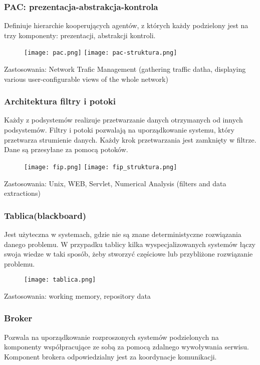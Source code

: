 \documentclass[a4paper]{article}
\begin{document}
\subsubsection{PAC: prezentacja-abstrakcja-kontrola}
Definiuje hierarchie kooperujących agentów, z których każdy
podzielony jest na trzy komponenty: prezentacji, abstrakcji kontroli.

\begin{figure}[h]
    \texttt{[image: pac.png]}
    \texttt{[image: pac-struktura.png]}
\end{figure}

    Zastosowania: Network Trafic Management (gathering traffic datha, displaying various user-configurable
    views of the whole network)

\subsubsection{Architektura filtry i potoki}

Każdy z podsystemów realizuje przetwarzanie danych
otrzymanych od innych podsystemów. Filtry i potoki
pozwalają na uporządkowanie systemu, który przetwarza strumienie danych.
Każdy krok przetwarzania jest zamknięty w filtrze. Dane są przesyłane za pomocą potoków.


\begin{figure}[h]
    \texttt{[image: fip.png]}
    \texttt{[image: fip\_struktura.png]}
\end{figure}


Zastosowania: Unix, WEB, Servlet, Numerical Analysis (filters and data extractions)

\subsubsection{Tablica(blackboard)}
Jest użyteczna w systemach, gdzie nie są znane deterministyczne
rozwiązania danego problemu. W przypadku tablicy kilka wyspecjalizowanych
systemów łączy swoja wiedze w taki sposób, żeby stworzyć częściowe lub
przybliżone rozwiązanie problemu.


\begin{figure}[h]
    \texttt{[image: tablica.png]}
\end{figure}

Zastosowania: working memory, repository data

\subsubsection{Broker}
Pozwala na uporządkowanie rozproszonych systemów podzielonych na
komponenty współpracujące ze sobą za pomocą zdalnego wywoływania
serwisu. Komponent brokera odpowiedzialny jest za koordynacje komunikacji.
\end{document}
